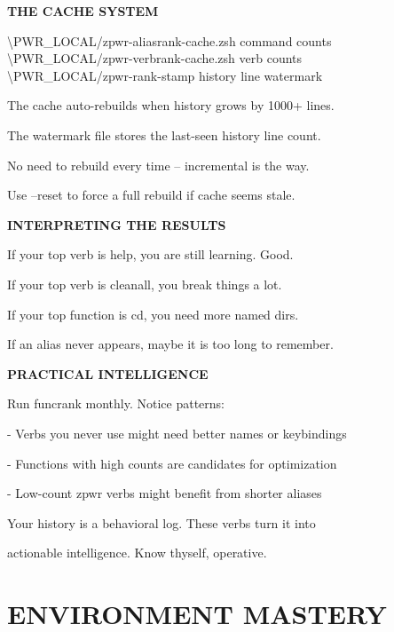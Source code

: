 \documentclass[11pt,a4paper,twoside]{book}
\begin{document}
\vspace{12pt}
{\bfseries\color{neonyellow} THE CACHE SYSTEM}\vspace{4pt}

\begin{codebox}
\textbackslash{}PWR\_LOCAL/zpwr-aliasrank-cache.zsh   command counts\\
\textbackslash{}PWR\_LOCAL/zpwr-verbrank-cache.zsh    verb counts\\
\textbackslash{}PWR\_LOCAL/zpwr-rank-stamp            history line watermark\\
\end{codebox}

The cache auto-rebuilds when history grows by 1000+ lines.

The watermark file stores the last-seen history line count.

No need to rebuild every time -- incremental is the way.

Use --reset to force a full rebuild if cache seems stale.


\vspace{12pt}
{\bfseries\color{neonyellow} INTERPRETING THE RESULTS}\vspace{4pt}

If your top verb is help, you are still learning. Good.

If your top verb is cleanall, you break things a lot.

If your top function is cd, you need more named dirs.

If an alias never appears, maybe it is too long to remember.


\vspace{12pt}
{\bfseries\color{neonyellow} PRACTICAL INTELLIGENCE}\vspace{4pt}

Run funcrank monthly. Notice patterns:

- Verbs you never use might need better names or keybindings

- Functions with high counts are candidates for optimization

- Low-count zpwr verbs might benefit from shorter aliases

Your history is a behavioral log. These verbs turn it into

actionable intelligence. Know thyself, operative.


\vspace{16pt}


\chapter{ENVIRONMENT MASTERY}
\end{document}
